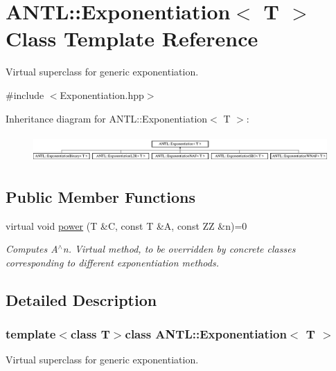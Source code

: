 \hypertarget{classANTL_1_1Exponentiation}{\section{A\-N\-T\-L\-:\-:Exponentiation$<$ T $>$ Class Template Reference}
\label{classANTL_1_1Exponentiation}
}


Virtual superclass for generic exponentiation.  




{\ttfamily \#include $<$Exponentiation.\-hpp$>$}

Inheritance diagram for A\-N\-T\-L\-:\-:Exponentiation$<$ T $>$\-:\begin{figure}[H]
\begin{center}
\leavevmode
\includegraphics[height=1.076923cm]{dd/da0/classANTL_1_1Exponentiation}
\end{center}
\end{figure}
\subsection*{Public Member Functions}
\begin{DoxyCompactItemize}
\item 
virtual void \hyperlink{classANTL_1_1Exponentiation_aad4e3be9ab770361f04a10a85d390622}{power} (T \&C, const T \&A, const Z\-Z \&n)=0
\begin{DoxyCompactList}\small\item\em Computes A$^\wedge$n. Virtual method, to be overridden by concrete classes corresponding to different exponentiation methods. \end{DoxyCompactList}\end{DoxyCompactItemize}


\subsection{Detailed Description}
\subsubsection*{template$<$class T$>$class A\-N\-T\-L\-::\-Exponentiation$<$ T $>$}

Virtual superclass for generic exponentiation. 

